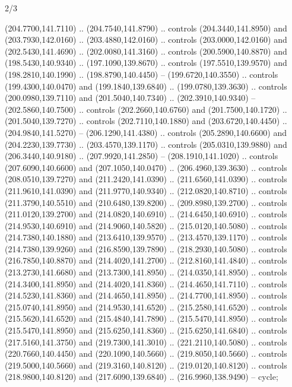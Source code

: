 \begin{flagdescription}{2/3}
\begin{scope}[xshift=0.5\flaglength,yshift=0.5\flagwidth,scale=\flagwidth/259.2]
\begin{scope}[y=0.8pt, x=0.8pt, yscale=-1,shift={(-243,-162)}]
      (204.7700,141.7110) .. (204.7540,141.8790) .. controls (204.3440,141.8950) and
      (203.7930,142.0160) .. (203.4880,142.0160) .. controls (203.0000,142.0160) and
      (202.5430,141.4690) .. (202.0080,141.3160) .. controls (200.5900,140.8870) and
      (198.5430,140.9340) .. (197.1090,139.8670) .. controls (197.5510,139.9570) and
      (198.2810,140.1990) .. (198.8790,140.4450) -- (199.6720,140.3550) .. controls
      (199.4300,140.0470) and (199.1840,139.6840) .. (199.0780,139.3630) .. controls
      (200.0980,139.7110) and (201.5040,140.7340) .. (202.3910,140.9340) --
      (202.5860,140.7500) .. controls (202.2660,140.6760) and (201.7500,140.1720) ..
      (201.5040,139.7270) .. controls (202.7110,140.1880) and (203.6720,140.4450) ..
      (204.9840,141.5270) -- (206.1290,141.4380) .. controls (205.2890,140.6600) and
      (204.2230,139.7730) .. (203.4570,139.1170) .. controls (205.0310,139.9880) and
      (206.3440,140.9180) .. (207.9920,141.2850) -- (208.1910,141.1020) .. controls
      (207.6090,140.6600) and (207.1050,140.0470) .. (206.4960,139.3630) .. controls
      (208.0510,139.7270) and (211.2420,141.0390) .. (211.6560,141.0390) .. controls
      (211.9610,141.0390) and (211.9770,140.9340) .. (212.0820,140.8710) .. controls
      (211.3790,140.5510) and (210.6480,139.8200) .. (209.8980,139.2700) .. controls
      (211.0120,139.2700) and (214.0820,140.6910) .. (214.6450,140.6910) .. controls
      (214.9530,140.6910) and (214.9060,140.5820) .. (215.0120,140.5080) .. controls
      (214.7380,140.1880) and (213.6410,139.9570) .. (213.4570,139.1170) .. controls
      (214.7380,139.9260) and (216.8590,139.7890) .. (218.2930,140.5080) .. controls
      (216.7850,140.8870) and (214.4020,141.2700) .. (212.8160,141.4840) .. controls
      (213.2730,141.6680) and (213.7300,141.8950) .. (214.0350,141.8950) .. controls
      (214.3400,141.8950) and (214.4020,141.8360) .. (214.4650,141.7110) .. controls
      (214.5230,141.8360) and (214.4650,141.8950) .. (214.7700,141.8950) .. controls
      (215.0740,141.8950) and (214.9530,141.6520) .. (215.2580,141.6520) .. controls
      (215.5620,141.6520) and (215.4840,141.7890) .. (215.5470,141.8950) .. controls
      (215.5470,141.8950) and (215.6250,141.8360) .. (215.6250,141.6840) .. controls
      (217.5160,141.3750) and (219.7300,141.3010) .. (221.2110,140.5080) .. controls
      (220.7660,140.4450) and (220.1090,140.5660) .. (219.8050,140.5660) .. controls
      (219.5000,140.5660) and (219.3160,140.8120) .. (219.0120,140.8120) .. controls
      (218.9800,140.8120) and (217.6090,139.6840) .. (216.9960,138.9490) -- cycle;

\end{scope}
\end{scope}
\end{flagdescription}
